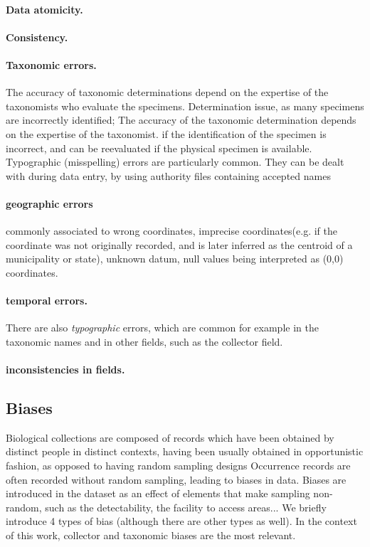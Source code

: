 \paragraph*{Data atomicity.}

\paragraph*{Consistency.}

%
\paragraph*{Taxonomic errors.}
The accuracy of taxonomic determinations depend on the expertise of the taxonomists who evaluate the specimens.
Determination issue, as many specimens are incorrectly identified;
The accuracy of the taxonomic determination depends on the expertise of the taxonomist.
if the identification of the specimen is incorrect, and can be reevaluated if the physical specimen is available.
Typographic (misspelling) errors are particularly common.
They can be dealt with during data entry, by using authority files containing accepted names 

\paragraph*{geographic errors}commonly associated to 
wrong coordinates, 
imprecise coordinates(e.g. if the coordinate was not originally recorded, and is later inferred as the centroid of a municipality or state), 
unknown datum, 
null values being interpreted as (0,0) coordinates.
%
\paragraph*{temporal errors.}
%
There are also \textit{typographic} errors, which are common for example in the taxonomic names and in other fields, such as the collector field.

\paragraph*{inconsistencies in fields.}


\subsection{Biases}
Biological collections are composed of records which have been obtained by distinct people in distinct contexts, having been usually obtained in opportunistic fashion, as opposed to having random sampling designs
Occurrence records are often recorded without random sampling, leading to biases in data.
Biases are introduced in the dataset as an effect of elements that make sampling non-random, such as the detectability, the facility to access areas...
We briefly introduce 4 types of bias (although there are other types as well).
In the context of this work, collector and taxonomic biases are the most relevant.

